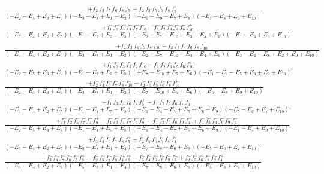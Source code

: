 \documentclass{article}
\begin{document}
\[\begin{array}{rcl}
\frac{+f_{2}^{-}f_{3}^{-}f_{5}^{-}f_{6}^{-}f_{8}^{-}f_{9}^{-}-f_{2}^{-}f_{3}^{-}f_{5}^{-}f_{7}^{-}f_{8}^{-}f_{9}^{+}}{(-E_{2}-E_{5}+E_{3}+E_{4})(-E_{3}-E_{8}+E_{1}+E_{2})(-E_{6}-E_{9}+E_{7}+E_{8})(-E_{5}-E_{8}+E_{9}+E_{10})}\\
\frac{+f_{1}^{-}f_{2}^{-}f_{3}^{-}f_{4}^{-}f_{7}^{-}f_{10}^{-}-f_{1}^{-}f_{2}^{-}f_{3}^{-}f_{4}^{-}f_{6}^{-}f_{10}^{+}}{(-E_{3}-E_{4}+E_{2}+E_{5})(-E_{1}-E_{2}+E_{3}+E_{8})(-E_{2}-E_{7}-E_{10}+E_{3}+E_{4}+E_{6})(-E_{1}-E_{4}+E_{9}+E_{10})}\\
\frac{+f_{2}^{-}f_{3}^{-}f_{4}^{-}f_{7}^{-}f_{8}^{-}f_{10}^{-}-f_{2}^{-}f_{3}^{-}f_{4}^{-}f_{6}^{-}f_{8}^{-}f_{10}^{+}}{(-E_{3}-E_{4}+E_{2}+E_{5})(-E_{3}-E_{8}+E_{1}+E_{2})(-E_{2}-E_{7}-E_{10}+E_{3}+E_{4}+E_{6})(-E_{3}-E_{4}-E_{8}+E_{2}+E_{9}+E_{10})}\\
\frac{+f_{1}^{-}f_{2}^{-}f_{3}^{-}f_{5}^{-}f_{7}^{-}f_{10}^{-}-f_{1}^{-}f_{2}^{-}f_{3}^{-}f_{5}^{-}f_{6}^{-}f_{10}^{+}}{(-E_{2}-E_{5}+E_{3}+E_{4})(-E_{1}-E_{2}+E_{3}+E_{8})(-E_{7}-E_{10}+E_{5}+E_{6})(-E_{1}-E_{2}-E_{5}+E_{3}+E_{9}+E_{10})}\\
\frac{+f_{2}^{-}f_{3}^{-}f_{5}^{-}f_{7}^{-}f_{8}^{-}f_{10}^{-}-f_{2}^{-}f_{3}^{-}f_{5}^{-}f_{6}^{-}f_{8}^{-}f_{10}^{+}}{(-E_{2}-E_{5}+E_{3}+E_{4})(-E_{3}-E_{8}+E_{1}+E_{2})(-E_{7}-E_{10}+E_{5}+E_{6})(-E_{5}-E_{8}+E_{9}+E_{10})}\\
\frac{+f_{1}^{-}f_{3}^{-}f_{4}^{-}f_{6}^{-}f_{7}^{-}f_{5}^{+}-f_{1}^{-}f_{2}^{-}f_{5}^{-}f_{6}^{-}f_{7}^{-}f_{4}^{+}}{(-E_{3}-E_{4}+E_{2}+E_{5})(-E_{1}-E_{4}+E_{5}+E_{8})(-E_{1}-E_{4}-E_{7}+E_{5}+E_{6}+E_{9})(-E_{5}-E_{6}+E_{7}+E_{10})}\\
\frac{+f_{1}^{-}f_{2}^{-}f_{5}^{-}f_{7}^{-}f_{4}^{+}f_{9}^{+}-f_{1}^{-}f_{3}^{-}f_{4}^{-}f_{7}^{-}f_{5}^{+}f_{9}^{+}-f_{1}^{-}f_{2}^{-}f_{5}^{-}f_{6}^{-}f_{9}^{-}f_{4}^{+}+f_{1}^{-}f_{3}^{-}f_{4}^{-}f_{6}^{-}f_{9}^{-}f_{5}^{+}}{(-E_{2}-E_{5}+E_{3}+E_{4})(-E_{1}-E_{4}+E_{5}+E_{8})(-E_{1}-E_{4}-E_{7}+E_{5}+E_{6}+E_{9})(-E_{1}-E_{4}+E_{9}+E_{10})}\\
\frac{+f_{3}^{-}f_{4}^{-}f_{6}^{-}f_{7}^{-}f_{8}^{-}f_{5}^{+}-f_{2}^{-}f_{5}^{-}f_{6}^{-}f_{7}^{-}f_{8}^{-}f_{4}^{+}}{(-E_{3}-E_{4}+E_{2}+E_{5})(-E_{5}-E_{8}+E_{1}+E_{4})(-E_{7}-E_{8}+E_{6}+E_{9})(-E_{5}-E_{6}+E_{7}+E_{10})}\\
\frac{+f_{3}^{-}f_{4}^{-}f_{7}^{-}f_{8}^{-}f_{5}^{+}f_{9}^{+}-f_{2}^{-}f_{5}^{-}f_{7}^{-}f_{8}^{-}f_{4}^{+}f_{9}^{+}-f_{3}^{-}f_{4}^{-}f_{6}^{-}f_{8}^{-}f_{9}^{-}f_{5}^{+}+f_{2}^{-}f_{5}^{-}f_{6}^{-}f_{8}^{-}f_{9}^{-}f_{4}^{+}}{(-E_{3}-E_{4}+E_{2}+E_{5})(-E_{5}-E_{8}+E_{1}+E_{4})(-E_{7}-E_{8}+E_{6}+E_{9})(-E_{5}-E_{8}+E_{9}+E_{10})}\\

\end{array}\]
\end{document}
